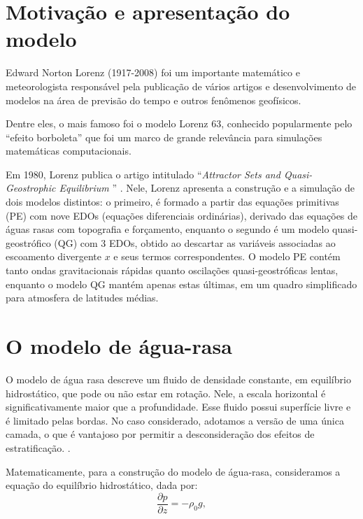 \section{Motivação e apresentação do modelo} \label{sec:ch01_apresentacao_do_modelo}

Edward Norton Lorenz (1917-2008) foi um importante matemático e meteorologista responsável pela publicação de vários artigos e desenvolvimento de modelos na área de previsão do tempo e outros fenômenos geofísicos.

Dentre eles, o mais famoso foi o modelo Lorenz 63, conhecido popularmente pelo ``efeito borboleta'' que foi um marco de grande relevância para simulações matemáticas computacionais. 

Em 1980, Lorenz publica o artigo intitulado ``\textit{Attractor Sets and Quasi-Geostrophic Equilibrium }'' \citep{Lorenz1980}. Nele, Lorenz apresenta a construção e a simulação de dois modelos distintos: o primeiro, é formado a partir das equações primitivas (PE) com nove EDOs (equações diferenciais ordinárias), derivado das equações de águas rasas com topografia e forçamento, enquanto o segundo é um modelo quasi-geostrófico (QG) com 3 EDOs, obtido ao descartar as variáveis associadas ao escoamento divergente $x$ e seus termos correspondentes. O modelo PE contém tanto ondas gravitacionais rápidas quanto oscilações quasi-geostróficas lentas, enquanto o modelo QG mantém apenas estas últimas, em um quadro simplificado para atmosfera de latitudes médias.


\section{O modelo de água-rasa} \label{sec:ch01_agua_rasa}
O modelo de água rasa descreve um fluido de densidade constante, em equilíbrio hidrostático, que pode ou não estar em rotação. Nele, a escala horizontal é significativamente maior que a profundidade. Esse fluido possui superfície livre e é limitado pelas bordas. No caso considerado, adotamos a versão de uma única camada, o que é vantajoso por permitir a desconsideração dos efeitos de estratificação. \citep{Vallis2017}.

Matematicamente, para a construção do modelo de água-rasa, consideramos a equação do equilíbrio hidrostático, dada por:
\begin{equation}
    \frac{\partial p}{\partial z} = - \rho_0g, \label{eq:equilibrio_hidrostatico}
\end{equation}

